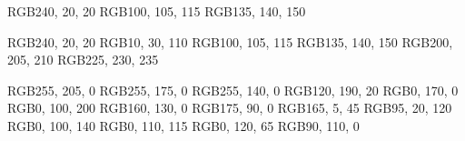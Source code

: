 
\usepackage[
	Internship,
]{optional}
 

\newcommand{\activateSperrvermerk}{def}


	\setdefaultlanguage[variant=german, latesthyphen=true]{german}


\newcommand{\studentname}{...}
\newcommand{\matrikelno}{...}
\newcommand{\kurs}{MA-TINF...}

\newcommand{\companyname}{DB Systel GmbH}
\newcommand{\companylocation}{Frankfurt am Main}

\newcommand{\studiengang}{Angewandte Informatik}
\newcommand{\dhbwDE}{Duale Hochschule Baden-Württemberg Mannheim}
\newcommand{\dhbwEN}{Baden-Wuerttemberg Cooperative State University Mannheim}

\newcommand{\reporttitle}{...}

\newcommand{\timerange}{... Wochen}
\newcommand{\handoverdate}{01.01.1970}
\newcommand{\city}{...}




\definecolor{PrimaryAccentColor}  	{RGB}{240, 20, 20}
\definecolor{SecondaryAccentColor}	{RGB}{100, 105, 115}
\definecolor{TertiaryAccentColor} 	{RGB}{135, 140, 150}

\definecolor{DbRot}     		{RGB}{240, 20, 20}
\definecolor{DbBlau}     		{RGB}{10, 30, 110}
\definecolor{DbDunkelgrau}	{RGB}{100, 105, 115}
\definecolor{DbGrau}     		{RGB}{135, 140, 150}
\definecolor{DbHellgrau}     	{RGB}{200, 205, 210}
\definecolor{DbWeissgrau}     	{RGB}{225, 230, 235}

\definecolor{DbGelb}     		{RGB}{255, 205, 0}
\definecolor{DbSonnengelb}     	{RGB}{255, 175, 0}
\definecolor{DbVerkehrsorange}	{RGB}{255, 140, 0}
\definecolor{DbGelbgruen}     	{RGB}{120, 190, 20}
\definecolor{DbGrasgruen}     	{RGB}{0, 170, 0}
\definecolor{DbSignalblau}     	{RGB}{0, 100, 200}
\definecolor{DbCurrygelb}     	{RGB}{160, 130, 0}
\definecolor{DbOrangebraun}   	{RGB}{175, 90, 0}
\definecolor{DbRubinrot}     	{RGB}{165, 5, 45}
\definecolor{DbPurpurviolett}  	{RGB}{95, 20, 120}
\definecolor{DbVerkehrsblau}  	{RGB}{0, 100, 140}
\definecolor{DbOpalgruen}     	{RGB}{0, 110, 115}
\definecolor{DbTuerkisgruen}  	{RGB}{0, 120, 65}
\definecolor{DbFarngruen}     	{RGB}{90, 110, 0}


